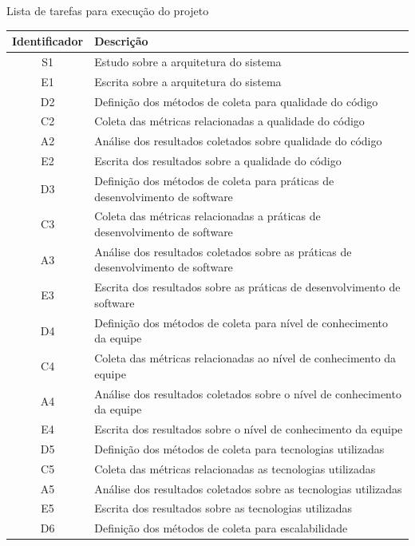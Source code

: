 \begin{quadro}
    \caption{Lista de tarefas para execução do projeto\label{quad:ListaDeTarefas}}
    \begin{tabular}{ | c | m{12cm} | }
    \hline
        \textbf{Identificador} &
        \textbf{Descrição} \\ \hline
        S1 & Estudo sobre a arquitetura do sistema \\ \hline
        E1 & Escrita sobre a arquitetura do sistema \\ \hline
        D2 & Definição dos métodos de coleta para qualidade do código \\ \hline
        C2 & Coleta das métricas relacionadas a qualidade do código \\ \hline
        A2 & Análise dos resultados coletados sobre qualidade do código \\ \hline
        E2 & Escrita dos resultados sobre a qualidade do código \\ \hline
        D3 & Definição dos métodos de coleta para práticas de desenvolvimento de software \\ \hline
        C3 & Coleta das métricas relacionadas a práticas de desenvolvimento de software \\ \hline
        A3 & Análise dos resultados coletados sobre as práticas de desenvolvimento de software \\ \hline
        E3 & Escrita dos resultados sobre as práticas de desenvolvimento de software \\ \hline
        D4 & Definição dos métodos de coleta para nível de conhecimento da equipe \\ \hline
        C4 & Coleta das métricas relacionadas ao nível de conhecimento da equipe \\ \hline
        A4 & Análise dos resultados coletados sobre o nível de conhecimento da equipe \\ \hline
        E4 & Escrita dos resultados sobre o nível de conhecimento da equipe \\ \hline
        D5 & Definição dos métodos de coleta para tecnologias utilizadas \\ \hline
        C5 & Coleta das métricas relacionadas as tecnologias utilizadas \\ \hline
        A5 & Análise dos resultados coletados sobre as tecnologias utilizadas \\ \hline
        E5 & Escrita dos resultados sobre as tecnologias utilizadas \\ \hline
        D6 & Definição dos métodos de coleta para escalabilidade \\ \hline

\end{tabular}
\end{quadro}
